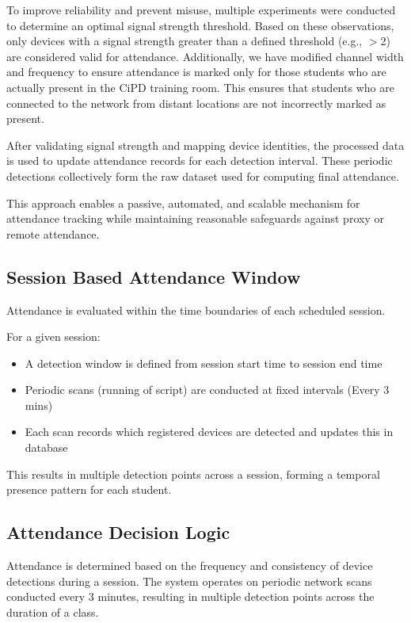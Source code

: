 To improve reliability and prevent misuse, multiple experiments were conducted to determine an
optimal signal strength threshold. Based on these observations, only devices with a signal strength
greater than a defined threshold (e.g., $>$2) are considered valid for attendance. Additionally, we have
modified channel width and frequency to ensure attendance is marked only for those students who
are actually present in the CiPD training room. This ensures that students who are connected to the
network from distant locations are not incorrectly marked as present.

After validating signal strength and mapping device identities, the processed data is used to update
attendance records for each detection interval. These periodic detections collectively form the raw
dataset used for computing final attendance.

This approach enables a passive, automated, and scalable mechanism for attendance tracking while
maintaining reasonable safeguards against proxy or remote attendance.

\subsection{Session Based Attendance Window}

Attendance is evaluated within the time boundaries of each scheduled session.

For a given session:

\begin{itemize}
    \item A detection window is defined from session start time to session end time
    \item Periodic scans (running of script) are conducted at fixed intervals (Every 3 mins)
    \item Each scan records which registered devices are detected and updates this in database
\end{itemize}

This results in multiple detection points across a session, forming a temporal presence pattern for
each student.

\subsection{Attendance Decision Logic}

Attendance is determined based on the frequency and consistency of device detections during a
session. The system operates on periodic network scans conducted every 3 minutes, resulting in
multiple detection points across the duration of a class.

